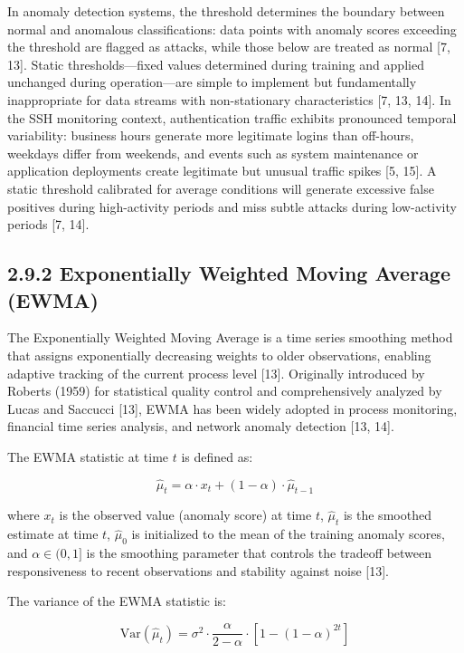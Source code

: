 \documentclass[
  a4paper]{report}
\begin{document}
In anomaly detection systems, the threshold determines the boundary
between normal and anomalous classifications: data points with anomaly
scores exceeding the threshold are flagged as attacks, while those below
are treated as normal {[}7, 13{]}. Static thresholds---fixed values
determined during training and applied unchanged during operation---are
simple to implement but fundamentally inappropriate for data streams
with non-stationary characteristics {[}7, 13, 14{]}. In the SSH
monitoring context, authentication traffic exhibits pronounced temporal
variability: business hours generate more legitimate logins than
off-hours, weekdays differ from weekends, and events such as system
maintenance or application deployments create legitimate but unusual
traffic spikes {[}5, 15{]}. A static threshold calibrated for average
conditions will generate excessive false positives during high-activity
periods and miss subtle attacks during low-activity periods {[}7, 14{]}.

\subsection{2.9.2 Exponentially Weighted Moving Average
(EWMA)}\label{exponentially-weighted-moving-average-ewma}

The Exponentially Weighted Moving Average is a time series smoothing
method that assigns exponentially decreasing weights to older
observations, enabling adaptive tracking of the current process level
{[}13{]}. Originally introduced by Roberts (1959) for statistical
quality control and comprehensively analyzed by Lucas and Saccucci
{[}13{]}, EWMA has been widely adopted in process monitoring, financial
time series analysis, and network anomaly detection {[}13, 14{]}.

The EWMA statistic at time \(t\) is defined as:

\[\hat{\mu}_t = \alpha \cdot x_t + (1 - \alpha) \cdot \hat{\mu}_{t-1}\]

where \(x_t\) is the observed value (anomaly score) at time \(t\),
\(\hat{\mu}_t\) is the smoothed estimate at time \(t\), \(\hat{\mu}_0\)
is initialized to the mean of the training anomaly scores, and
\(\alpha \in (0, 1]\) is the smoothing parameter that controls the
tradeoff between responsiveness to recent observations and stability
against noise {[}13{]}.

The variance of the EWMA statistic is:

\[\text{Var}(\hat{\mu}_t) = \sigma^2 \cdot \frac{\alpha}{2 - \alpha} \cdot \left[1 - (1 - \alpha)^{2t}\right]\]
\end{document}
